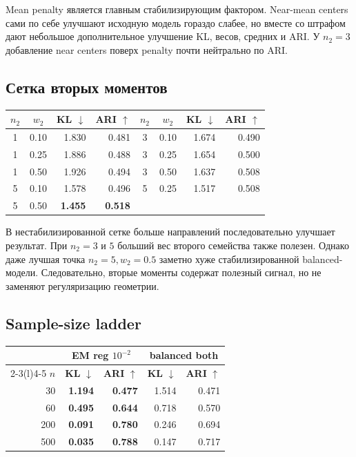 \documentclass[11pt,a4paper]{article}
\newcommand{\best}[1]{\textbf{\color{green}#1}}
\begin{document}
Mean penalty является главным стабилизирующим фактором. Near-mean centers
сами по себе улучшают исходную модель гораздо слабее, но вместе со штрафом
дают небольшое дополнительное улучшение KL, весов, средних и ARI.
У $n_2=3$ добавление near centers поверх penalty почти нейтрально по ARI.

\subsection{Сетка вторых моментов}

\begin{center}
\small
\begin{tabular}{@{}ccrr@{\qquad}ccrr@{}}
\toprule
\rowcolor{lightgray}
$n_2$ & $w_2$ & \textbf{KL} $\downarrow$ & \textbf{ARI} $\uparrow$ &
$n_2$ & $w_2$ & \textbf{KL} $\downarrow$ & \textbf{ARI} $\uparrow$\\
\midrule
1 & 0.10 & 1.830 & 0.481 & 3 & 0.10 & 1.674 & 0.490\\
1 & 0.25 & 1.886 & 0.488 & 3 & 0.25 & 1.654 & 0.500\\
1 & 0.50 & 1.926 & 0.494 & 3 & 0.50 & 1.637 & 0.508\\
\midrule
5 & 0.10 & 1.578 & 0.496 & 5 & 0.25 & 1.517 & 0.508\\
5 & 0.50 & \best{1.455} & \best{0.518} & & & &\\
\bottomrule
\end{tabular}
\end{center}

В нестабилизированной сетке больше направлений последовательно улучшает
результат. При $n_2=3$ и $5$ больший вес второго семейства также полезен.
Однако даже лучшая точка $n_2=5,w_2=0.5$ заметно хуже стабилизированной
balanced-модели. Следовательно, вторые моменты содержат полезный сигнал, но
не заменяют регуляризацию геометрии.

\subsection{Sample-size ladder}

\begin{center}
\small
\begin{tabular}{@{}r rr rr@{}}
\toprule
\rowcolor{lightgray}
& \multicolumn{2}{c}{\textbf{EM reg $10^{-2}$}} &
\multicolumn{2}{c}{\textbf{balanced both}}\\
\cmidrule(lr){2-3}\cmidrule(l){4-5}
$n$ & \textbf{KL} $\downarrow$ & \textbf{ARI} $\uparrow$ &
\textbf{KL} $\downarrow$ & \textbf{ARI} $\uparrow$\\
\midrule
30  & \best{1.194} & \best{0.477} & 1.514 & 0.471\\
60  & \best{0.495} & \best{0.644} & 0.718 & 0.570\\
200 & \best{0.091} & \best{0.780} & 0.246 & 0.694\\
500 & \best{0.035} & \best{0.788} & 0.147 & 0.717\\
\bottomrule
\end{tabular}
\end{center}
\end{document}
